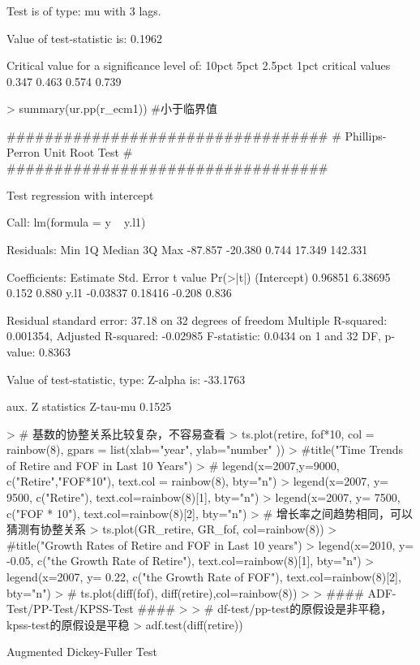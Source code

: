 \documentclass{article}
\begin{document}
\begin{Schunk}
\begin{Soutput}
Test is of type: mu with 3 lags. 

Value of test-statistic is: 0.1962 

Critical value for a significance level of: 
                10pct  5pct 2.5pct  1pct
critical values 0.347 0.463  0.574 0.739
\end{Soutput}
\begin{Sinput}
> summary(ur.pp(r_ecm1)) #小于临界值
\end{Sinput}
\begin{Soutput}
################################## 
# Phillips-Perron Unit Root Test # 
################################## 

Test regression with intercept 


Call:
lm(formula = y ~ y.l1)

Residuals:
    Min      1Q  Median      3Q     Max 
-87.857 -20.380   0.744  17.349 142.331 

Coefficients:
            Estimate Std. Error t value Pr(>|t|)
(Intercept)  0.96851    6.38695   0.152    0.880
y.l1        -0.03837    0.18416  -0.208    0.836

Residual standard error: 37.18 on 32 degrees of freedom
Multiple R-squared:  0.001354,	Adjusted R-squared:  -0.02985 
F-statistic: 0.0434 on 1 and 32 DF,  p-value: 0.8363


Value of test-statistic, type: Z-alpha  is: -33.1763 

         aux. Z statistics
Z-tau-mu            0.1525
\end{Soutput}
\begin{Sinput}
> # 基数的协整关系比较复杂，不容易查看
> ts.plot(retire, fof*10, col = rainbow(8), gpars = list(xlab="year", ylab="number" ))
> #title("Time Trends of Retire and FOF in Last 10 Years")
> # legend(x=2007,y=9000, c("Retire","FOF*10"), text.col = rainbow(8), bty="n")
> legend(x=2007, y= 9500, c("Retire"), text.col=rainbow(8)[1], bty="n")
> legend(x=2007, y= 7500, c("FOF * 10"), text.col=rainbow(8)[2], bty="n")
> # 增长率之间趋势相同，可以猜测有协整关系
> ts.plot(GR_retire, GR_fof, col=rainbow(8))
> #title("Growth Rates of Retire and FOF in Last 10 years")
> legend(x=2010, y= -0.05, c("the Growth Rate of Retire"), text.col=rainbow(8)[1], bty="n")
> legend(x=2007, y= 0.22, c("the Growth Rate of FOF"), text.col=rainbow(8)[2], bty="n")
> # ts.plot(diff(fof), diff(retire),col=rainbow(8))
> 
> #### ADF-Test/PP-Test/KPSS-Test ####
> 
> # df-test/pp-test的原假设是非平稳， kpss-test的原假设是平稳
> adf.test(diff(retire))
\end{Sinput}
\begin{Soutput}
	Augmented Dickey-Fuller Test


\end{Soutput}
\end{Schunk}
\end{document}
